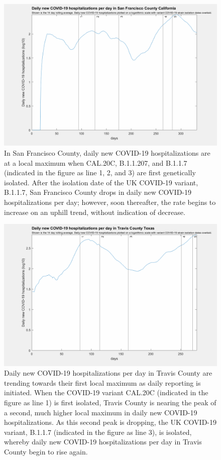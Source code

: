 \documentclass[]{article}
\begin{document}
\begin{figure}[!h]
	\includegraphics[width=\linewidth]{images/san_francisco_hospitalizations_strains_log.png}
	\caption{In San Francisco County, daily new COVID-19 hospitalizations are at a local maximum when CAL.20C, B.1.1.207, and B.1.1.7 (indicated in the figure as line 1, 2, and 3) are first genetically isolated. After the isolation date of the UK COVID-19 variant, B.1.1.7, San Francisco County drops in daily new COVID-19 hospitalizations per day; however, soon thereafter, the rate begins to increase on an uphill trend, without indication of decrease.  }
	\label{fig:images/san_francisco_hospitalizations_strains_logLabel}
\end{figure}

\begin{figure}[!h]
	\includegraphics[width=\linewidth]{images/travis_hospitalizations_strains_log.png}
	\caption{Daily new COVID-19 hospitalizations per day in Travis County are trending towards their first local maximum as daily reporting is initiated. When the COVID-19 variant CAL.20C (indicated in the figure as line 1) is first isolated, Travis County is nearing the peak of a second, much higher local maximum in daily new COVID-19 hospitalizations. As this second peak is dropping, the UK COVID-19 variant, B.1.1.7 (indicated in the figure as line 3), is isolated, whereby daily new COVID-19 hospitalizations per day in Travis County begin to rise again.  }
	\label{fig:images/travis_hospitalizations_strains_logLabel}
\end{figure}
\end{document}
